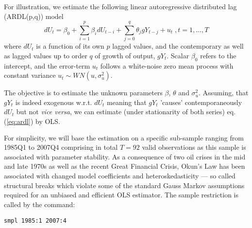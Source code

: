 \documentclass[11pt]{article}
\begin{document}
For illustration, we estimate the following linear autoregressive distributed lag (ARDL(p,q)) model
\begin{equation}
	\label{eq:ardl}
	dU_t = \beta_0 + \sum_{i=1}^{p} \beta_i dU_{t-i} + \sum_{j=0}^{q} \theta_j gY_{t-j} + u_t\; , t=1, \ldots, T
\end{equation}
where $ dU_t $ is a function of its own $ p $ lagged values, and the contemporary as well as lagged values up to order $ q $ of growth of output, $ gY_t $. Scalar $ \beta_0 $ refers to the intercept, and the error-term $ u_t $ follows a white-noise zero mean process with constant variance $ u_t \sim WN(u, \sigma^2_u) $.

The objective is to estimate the unknown parameters $ \beta $, $ \theta $ and $ \sigma^2_u $. Assuming, that $ gY_t $ is indeed exogenous w.r.t. $ dU_t $ meaning that $ gY_t $ 'causes' contemporaneously $ dU_t $ but not \textit{vice versa}, we can estimate (under stationarity of both series) eq. (\ref{eq:ardl}) by OLS.

For simplicity, we will base the estimation on a specific sub-sample ranging from 1985Q1 to 2007Q4 comprising in total $ T=92 $ valid observations as this sample is associated with parameter stability. As a consequence of two oil crises in the mid and late 1970s as well as the recent Great Financial Crisis, Okun's Law has been associated with changed model coefficients and heteroskedasticity --- so called structural breaks which violate some of the standard Gauss Markov assumptions required for an unbiased and efficient OLS estimator. The sample restriction is called by the command:
\begin{Verbatim}[baselinestretch=0.75, fontsize=\small]
smpl 1985:1 2007:4
\end{Verbatim}
\end{document}
